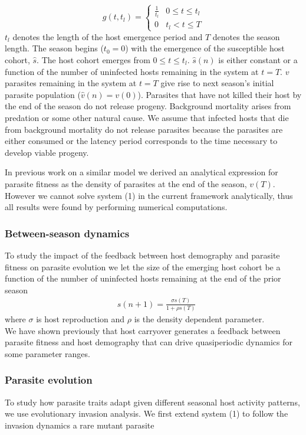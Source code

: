 \documentclass{article}
\begin{document}
 \[ g(t,t_{l}) = \begin{cases}
          \frac{1}{t_{l}} & 0 \leq t\leq t_{l} \\
          0 & t_{l}< t\leq T
       \end{cases}
    \]
$t_{l}$ denotes the length of the host emergence period and $T$ denotes the season length. The season begins ($t_{0}=0$) with the emergence of the susceptible host cohort, $\hat{s}$. The host cohort emerges from $0 \leq t\leq t_{l}.$ $\hat{s}(n)$ is either constant or a function of the number of uninfected hosts remaining in the system at $t = T$. $v$ parasites remaining in the system at $t = T$ give rise to next season's initial parasite population ($\hat{v}(n) = v(0)$). Parasites that have not killed their host by the end of the season do not release progeny. Background mortality arises from predation or some other natural cause. We assume that infected hosts that die from background mortality do not release parasites because the parasites are either consumed or the latency period corresponds to the time necessary to develop viable progeny\cite{wang2006lysis,white2011determinants}.

In previous work on a similar model we derived an analytical expression for parasite fitness as the density of parasites at the end of the season, $v(T)$\cite{macdonald2021host}. However we cannot solve system (1) in the current framework analytically, thus all results were found by performing numerical computations.

\subsubsection{Between-season dynamics}
To study the impact of the feedback between host demography and parasite fitness on parasite evolution we let the size of the emerging host cohort be a function of the number of uninfected hosts remaining at the end of the prior season
\begin{align*}
    &\hat{s}(n+1) = \frac{\sigma s(T)}{1+\rho s(T)}
\end{align*}
\noindent where $\sigma$ is host reproduction and $\rho$ is the density dependent parameter. \\

\noindent We have shown previously that host carryover generates a feedback between parasite fitness and host demography that can drive quasiperiodic dynamics for some parameter ranges\cite{}.

\subsubsection{Parasite evolution}
\noindent To study how parasite traits adapt given different seasonal host activity patterns, we use evolutionary invasion analysis\cite{metz1992should,geritz1998evolutionarily}. We first extend system (1) to follow the invasion dynamics a rare mutant parasite
\end{document}
